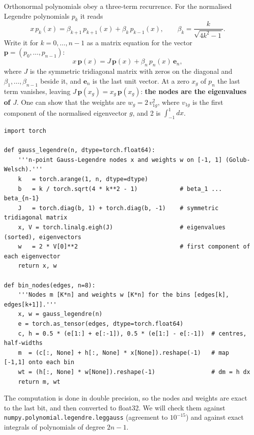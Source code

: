 \documentclass[11pt]{article}
\newcommand{\code}[1]{\texttt{#1}}
\begin{document}
\begin{aside}
Orthonormal polynomials obey a three-term recurrence. For the normalised Legendre polynomials
$p_k$ it reads
\begin{equation}
  x\,p_k(x) = \beta_{k+1}\,p_{k+1}(x) + \beta_k\,p_{k-1}(x), \qquad \beta_k = \frac{k}{\sqrt{4k^2-1}} .
\end{equation}
Write it for $k = 0,\dots,n-1$ as a matrix equation for the vector
$\boldsymbol p = (p_0,\dots,p_{n-1})$:
\begin{equation}
  x\,\boldsymbol p(x) = J\,\boldsymbol p(x) + \beta_n\,p_n(x)\,\boldsymbol e_n ,
\end{equation}
where $J$ is the symmetric tridiagonal matrix with zeros on the diagonal and
$\beta_1,\dots,\beta_{n-1}$ beside it, and $\boldsymbol e_n$ is the last unit vector. At a zero
$x_g$ of $p_n$ the last term vanishes, leaving $J\,\boldsymbol p(x_g) = x_g\,\boldsymbol p(x_g)$:
\textbf{the nodes are the eigenvalues of $J$}. One can show that the weights are $w_g = 2\,v_{1g}^2$,
where $v_{1g}$ is the first component of the normalised eigenvector $g$, and 2 is
$\int_{-1}^1 dx$.
\end{aside}

\begin{lstlisting}
import torch

def gauss_legendre(n, dtype=torch.float64):
    '''n-point Gauss-Legendre nodes x and weights w on [-1, 1] (Golub-Welsch).'''
    k   = torch.arange(1, n, dtype=dtype)
    b   = k / torch.sqrt(4 * k**2 - 1)            # beta_1 ... beta_{n-1}
    J   = torch.diag(b, 1) + torch.diag(b, -1)    # symmetric tridiagonal matrix
    x, V = torch.linalg.eigh(J)                   # eigenvalues (sorted), eigenvectors
    w   = 2 * V[0]**2                             # first component of each eigenvector
    return x, w

def bin_nodes(edges, n=8):
    '''Nodes m [K*n] and weights w [K*n] for the bins [edges[k], edges[k+1]].'''
    x, w = gauss_legendre(n)
    e = torch.as_tensor(edges, dtype=torch.float64)
    c, h = 0.5 * (e[1:] + e[:-1]), 0.5 * (e[1:] - e[:-1])  # centres, half-widths
    m  = (c[:, None] + h[:, None] * x[None]).reshape(-1)   # map [-1,1] onto each bin
    wt = (h[:, None] * w[None]).reshape(-1)                # dm = h dx
    return m, wt
\end{lstlisting}

The computation is done in double precision, so the nodes and weights are exact to the last
bit, and then converted to float32. We will check them against \code{numpy.polynomial.legendre.leggauss}
(agreement to $10^{-15}$) and against exact integrals of polynomials of degree $2n-1$.
\end{document}
